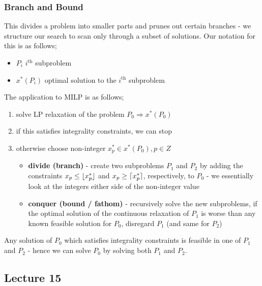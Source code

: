 \documentclass[a4paper, 12pt]{article}
\DeclarePairedDelimiter{\ceil}{\lceil}{\rceil}
\DeclarePairedDelimiter{\floor}{\lfloor}{\rfloor}
\begin{document}
            \subsubsection*{Branch and Bound}
                This divides a problem into smaller parts and prunes out certain branches - we structure our search to scan only through a subset of solutions.
                Our notation for this is as follows;
                \begin{itemize}
                    \itemsep0em
                    \item $P_i$ \hfill $i^\text{th}$ subproblem
                    \item $x^*(P_i)$ \hfill optimal solution to the $i^\text{th}$ subproblem
                \end{itemize}
                The application to MILP is as follows;
                \begin{enumerate}[1.]
                    \itemsep0em
                    \item solve LP relaxation of the problem $P_0 \Rightarrow x^*(P_0)$
                    \item if this satisfies integrality constraints, we can stop
                    \item otherwise choose non-integer $x^*_p \in x^*(P_0), p \in Z$
                        \begin{itemize}
                            \itemsep0em
                            \item \textbf{divide (branch)} - create two subproblems $P_1$ and $P_2$ by adding the constraints $x_p \leq \floor{x^*_p}$ and $x_p \geq \ceil{x^*_p}$, respectively, to $P_0$ - we essentially look at the integers either side of the non-integer value
                            \item \textbf{conquer (bound / fathom)} - recursively solve the new subproblems, if the optimal solution of the continuous relaxation of $P_1$ is worse than any known feasible solution for $P_0$, disregard $P_1$ (and same for $P_2$)
                        \end{itemize}
                \end{enumerate}
                Any solution of $P_0$ which satisfies integrality constraints is feasible in one of $P_1$ and $P_2$ - hence we can solve $P_0$ by solving both $P_1$ and $P_2$.
        \subsection*{Lecture 15}
\end{document}
